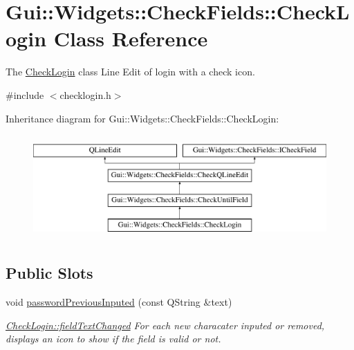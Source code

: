 \hypertarget{classGui_1_1Widgets_1_1CheckFields_1_1CheckLogin}{}\section{Gui\+:\+:Widgets\+:\+:Check\+Fields\+:\+:Check\+Login Class Reference}
\label{classGui_1_1Widgets_1_1CheckFields_1_1CheckLogin}


The \hyperlink{classGui_1_1Widgets_1_1CheckFields_1_1CheckLogin}{Check\+Login} class Line Edit of login with a check icon.  




{\ttfamily \#include $<$checklogin.\+h$>$}

Inheritance diagram for Gui\+:\+:Widgets\+:\+:Check\+Fields\+:\+:Check\+Login\+:\begin{figure}[H]
\begin{center}
\leavevmode
\includegraphics[height=4.000000cm]{dd/dfe/classGui_1_1Widgets_1_1CheckFields_1_1CheckLogin}
\end{center}
\end{figure}
\subsection*{Public Slots}
\begin{DoxyCompactItemize}
\item 
\hypertarget{classGui_1_1Widgets_1_1CheckFields_1_1CheckLogin_a2d58496a2b60c529b0c74e930622fcee}{}void \hyperlink{classGui_1_1Widgets_1_1CheckFields_1_1CheckLogin_a2d58496a2b60c529b0c74e930622fcee}{password\+Previous\+Inputed} (const Q\+String \&text)\label{classGui_1_1Widgets_1_1CheckFields_1_1CheckLogin_a2d58496a2b60c529b0c74e930622fcee}

\begin{DoxyCompactList}\small\item\em \hyperlink{classGui_1_1Widgets_1_1CheckFields_1_1CheckQLineEdit_ad297d518964bd170e8cc7533795ff99e}{Check\+Login\+::field\+Text\+Changed} For each new characater inputed or removed, displays an icon to show if the field is valid or not. \end{DoxyCompactList}\end{DoxyCompactItemize}
